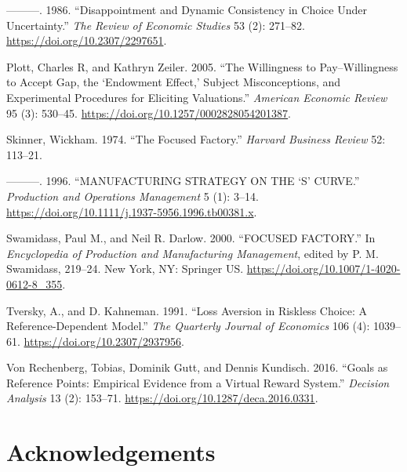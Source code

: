 \documentclass[
  12,
  letterpaper,
  DIV=11,
  numbers=noendperiod]{scrartcl}
\newlength{\cslhangindent}
\newenvironment{CSLReferences}[2] %
 {\begin{list}{}{%
  \setlength{\itemindent}{0pt}
  \setlength{\leftmargin}{0pt}
  \setlength{\parsep}{0pt}
  \ifodd #1
   \setlength{\leftmargin}{\cslhangindent}
   \setlength{\itemindent}{-1\cslhangindent}
  \fi
  \setlength{\itemsep}{#2\baselineskip}}}
 {\end{list}}
\begin{document}
\begin{CSLReferences}{1}{0}
---------. 1986. {``Disappointment and {Dynamic Consistency} in {Choice}
Under {Uncertainty}.''} \emph{The Review of Economic Studies} 53 (2):
271--82. \url{https://doi.org/10.2307/2297651}.

Plott, Charles R, and Kathryn Zeiler. 2005. {``The {Willingness} to
{Pay}--{Willingness} to {Accept Gap}, the {`{Endowment Effect},'}
{Subject Misconceptions}, and {Experimental Procedures} for {Eliciting
Valuations}.''} \emph{American Economic Review} 95 (3): 530--45.
\url{https://doi.org/10.1257/0002828054201387}.

Skinner, Wickham. 1974. {``The Focused Factory.''} \emph{Harvard
Business Review} 52: 113--21.

---------. 1996. {``{MANUFACTURING STRATEGY ON THE} {`{S}'} {CURVE}.''}
\emph{Production and Operations Management} 5 (1): 3--14.
\url{https://doi.org/10.1111/j.1937-5956.1996.tb00381.x}.

Swamidass, Paul M., and Neil R. Darlow. 2000. {``{FOCUSED FACTORY}.''}
In \emph{Encyclopedia of {Production} and {Manufacturing Management}},
edited by P. M. Swamidass, 219--24. New York, NY: Springer US.
\url{https://doi.org/10.1007/1-4020-0612-8_355}.

Tversky, A., and D. Kahneman. 1991. {``Loss {Aversion} in {Riskless
Choice}: {A Reference-Dependent Model}.''} \emph{The Quarterly Journal
of Economics} 106 (4): 1039--61. \url{https://doi.org/10.2307/2937956}.

Von Rechenberg, Tobias, Dominik Gutt, and Dennis Kundisch. 2016.
{``Goals as {Reference Points}: {Empirical Evidence} from a {Virtual
Reward System}.''} \emph{Decision Analysis} 13 (2): 153--71.
\url{https://doi.org/10.1287/deca.2016.0331}.

\end{CSLReferences}

\newpage

\section{Acknowledgements}\label{acknowledgements}
\end{document}
